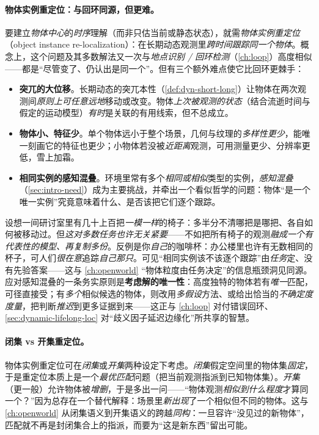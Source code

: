 \paragraph{物体实例重定位：与回环同源，但更难。}
要建立\emph{物体中心}的\emph{时序}理解（而非只估当前或静态状态），就需\emph{物体实例重定位}（object instance re-localization）：在长期动态观测里\emph{跨时间跟踪同一个物体}。概念上，这个问题及其多数解法又一次与\emph{地点识别 / 回环检测}（\cref{ch:loop}）高度相似——都是“尽管变了、仍认出是同一个”。但有三个额外难点使它比回环更棘手\cite{schmid2026dynamic}：
\begin{itemize}
  \item \textbf{突兀的大位移}。长期动态的突兀本性（\cref{def:dyn-short-long}）让物体在两次观测间\emph{原则上可任意远地}移动或改变。物体\emph{上次被观测的状态}（结合流逝时间与假定的运动模型）\emph{有时}是关联的有用线索，但不总成立。
  \item \textbf{物体小、特征少}。单个物体远小于整个场景，几何与纹理的\emph{多样性更少}，能唯一刻画它的特征也更少；小物体若没被\emph{近距离}观测，可用测量更少、分辨率更低，雪上加霜。
  \item \textbf{相同实例的感知混叠}。环境里常有多个\emph{相同或相似}类型的实例，\emph{感知混叠}（\cref{sec:intro-need}）成为主要挑战，并牵出一个看似哲学的问题：物体“是一个唯一实例”究竟意味着什么、是否该把它们逐个跟踪。
\end{itemize}

\begin{insight}
设想一间研讨室里有几十上百把\emph{一模一样}的椅子：多半分不清哪把是哪把、各自如何被移动过。但\emph{这对多数任务也许无关紧要}——不如把所有椅子的观测\emph{融成一个有代表性的模型、再复制多份}。反例是你\emph{自己}的咖啡杯：办公楼里也许有无数相同的杯子，可人们\emph{很在意}追踪\emph{自己那只}。可见“相同实例该不该逐个跟踪”由\emph{任务}定、没有先验答案——这与 \cref{ch:openworld} “物体粒度由任务决定”的信息瓶颈洞见同源。应对感知混叠的一条务实原则是\textbf{考虑解的唯一性}：高度独特的物体若有\emph{唯一}匹配，可径直接受；有\emph{多个}相似候选的物体，则改用\emph{多假设}方法、或给出恰当的\emph{不确定度度量}，把判断\emph{推迟}到更多证据到来——这正与 \cref{ch:loop} 对付错误回环、\cref{sec:dynamic-lifelong-loc} 对“歧义因子延迟边缘化”所共享的智慧。
\end{insight}

\paragraph{闭集 vs 开集重定位。}
物体实例重定位可在\emph{闭集}或\emph{开集}两种设定下考虑\cite{schmid2026dynamic}。\emph{闭集}假定空间里的物体集\emph{固定}，于是重定位本质上是一个\emph{最优匹配}问题（把当前观测指派到已知物体集）。\emph{开集}（更一般）允许物体被\emph{增删}，于是多出一问——“物体观测\emph{相似到什么程度}才算同一个？”因为总存在一个替代解释：场景里\emph{新出现}了一个相似但不同的物体。这与 \cref{ch:openworld} 从闭集语义到开集语义的跨越\emph{同构}：一旦容许“没见过的新物体”，匹配就不再是封闭集合上的指派，而要为“这是新东西”留出可能。

